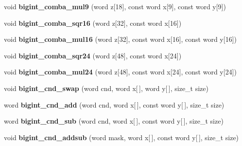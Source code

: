 \begin{DoxyCompactItemize}
\mbox{\label{namespace_botan_ab39ab0e2749117461149c90d7257165b}} 
void {\bfseries bigint\+\_\+comba\+\_\+mul9} (word z\mbox{[}18\mbox{]}, const word x\mbox{[}9\mbox{]}, const word y\mbox{[}9\mbox{]})
\item 
\mbox{\label{namespace_botan_a30ebe1c6ee7857c89289468549532a3e}} 
void {\bfseries bigint\+\_\+comba\+\_\+sqr16} (word z\mbox{[}32\mbox{]}, const word x\mbox{[}16\mbox{]})
\item 
\mbox{\label{namespace_botan_adf5900b5388f9c73ab26a964a45f734c}} 
void {\bfseries bigint\+\_\+comba\+\_\+mul16} (word z\mbox{[}32\mbox{]}, const word x\mbox{[}16\mbox{]}, const word y\mbox{[}16\mbox{]})
\item 
\mbox{\label{namespace_botan_aa1c0ff2f5395f16456b301a51f460fd7}} 
void {\bfseries bigint\+\_\+comba\+\_\+sqr24} (word z\mbox{[}48\mbox{]}, const word x\mbox{[}24\mbox{]})
\item 
\mbox{\label{namespace_botan_a95c9784ce152ae5b93e069c17dda9efc}} 
void {\bfseries bigint\+\_\+comba\+\_\+mul24} (word z\mbox{[}48\mbox{]}, const word x\mbox{[}24\mbox{]}, const word y\mbox{[}24\mbox{]})
\item 
\mbox{\label{namespace_botan_ab01ddbecf986eb6cfa5f827329e597f1}} 
void {\bfseries bigint\+\_\+cnd\+\_\+swap} (word cnd, word x\mbox{[}$\,$\mbox{]}, word y\mbox{[}$\,$\mbox{]}, size\+\_\+t size)
\item 
\mbox{\label{namespace_botan_a61087c72df0cb4e48c6e592e3dc33504}} 
word {\bfseries bigint\+\_\+cnd\+\_\+add} (word cnd, word x\mbox{[}$\,$\mbox{]}, const word y\mbox{[}$\,$\mbox{]}, size\+\_\+t size)
\item 
\mbox{\label{namespace_botan_a90cfc5af3085f44856d3656b802c0d2a}} 
word {\bfseries bigint\+\_\+cnd\+\_\+sub} (word cnd, word x\mbox{[}$\,$\mbox{]}, const word y\mbox{[}$\,$\mbox{]}, size\+\_\+t size)
\item 
\mbox{\label{namespace_botan_afd797de418a99fb564dc3b347be5de09}} 
void {\bfseries bigint\+\_\+cnd\+\_\+addsub} (word mask, word x\mbox{[}$\,$\mbox{]}, const word y\mbox{[}$\,$\mbox{]}, size\+\_\+t size)

\end{DoxyCompactItemize}
